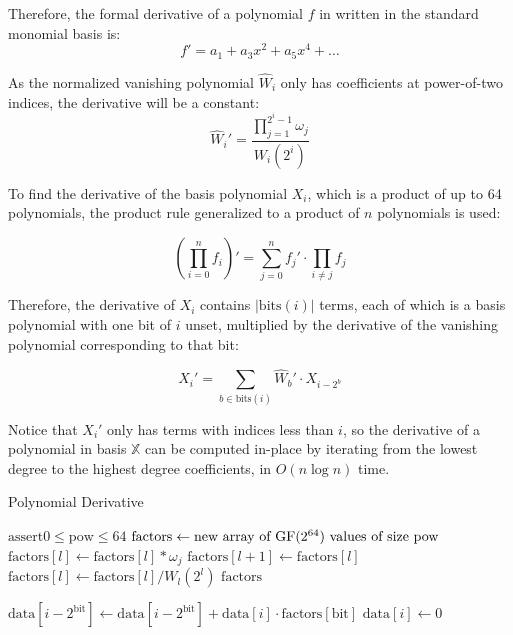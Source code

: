 Therefore, the formal derivative of a polynomial $f$ in  written in the standard monomial basis is:
\[f' = a_1 + a_3 x^2 + a_5 x^4 + \ldots\]

As the normalized vanishing polynomial $\hat{W}_i$ only has coefficients at power-of-two indices, the derivative will be a constant:
\[\hat{W}_i' = \frac{\prod_{j = 1}^{2^i - 1} \omega_j}{W_i(2^i)}\]

To find the derivative of the basis polynomial $X_i$, which is a product of up to 64 polynomials, the product rule generalized to a product of $n$ polynomials is used:

\[
(\prod_{i = 0}^{n} f_i)' = \sum_{j = 0}^{n} f_j' \cdot \prod_{i \neq j} f_j
\]

Therefore, the derivative of $X_i$ contains $|\text{bits}(i)|$ terms, each of which is a basis polynomial with one bit of $i$ unset, multiplied by the derivative of the vanishing polynomial corresponding to that bit:

\[
X_i' = \sum_{b \in \text{bits}(i)} \hat{W}_b' \cdot X_{i - 2^b}
\]

Notice that $X_i'$ only has terms with indices less than $i$, so the derivative of a polynomial in basis $\mathbb{X}$ can be computed in-place by iterating from the lowest degree to the highest degree coefficients, in $O(n \log n)$ time.

\begin{algorithm}
    \caption{Polynomial Derivative}
    \begin{algorithmic}
            \State $\text{assert} 0 \leq \text{pow} \le 64$
            \State $\text{factors} \gets \text{new array of $\text{GF}(2^{64})$ values of size } \text{pow}$
                    \State $\text{factors}[l] \gets \text{factors}[l] * \omega_j$
                \EndFor
                    \State $\text{factors}[l + 1] \gets \text{factors}[l]$
                \EndIf
                \State $\text{factors}[l] \gets \text{factors}[l] / W_l(2^l)$
            \EndFor
            \State \Return $\text{factors}$
        \EndFunction
    \end{algorithmic}
    \begin{algorithmic}
                        \State $\text{data}[i - 2^{\text{bit}}] \gets \text{data}[i - 2^{\text{bit}}] + \text{data}[i] \cdot \text{factors}[\text{bit}]$
                    \EndIf
                \EndFor
                \State $\text{data}[i] \gets 0$
            \EndFor
        \EndFunction
    \end{algorithmic}
\end{algorithm}

